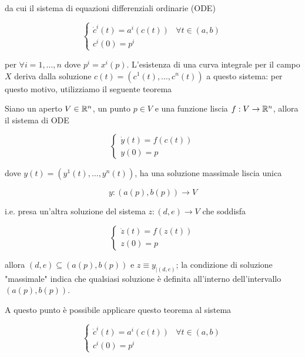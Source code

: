 da cui il sistema di equazioni differenziali ordinarie (ODE)

\begin{equation}
	\begin{cases}
		\dot{c}^{i}(t) = a^{i}(c(t)) & \forall t \in (a,b)\\
		c^{i}(0) = p^{i}
	\end{cases}
\end{equation}

per $ \forall i=1,\dots,n $ dove $ p^{i} = x^{i} (p) $. L'esistenza di una curva integrale per il campo $ X $ deriva dalla soluzione $ c(t) = (c^{1}(t),\dots,c^{n}(t)) $ a questo sistema: per questo motivo, utilizziamo il seguente teorema

\begin{theorem}
	Siano un aperto $ V \in \mathbb{R}^{n} $, un punto $ p \in V $ e una funzione liscia $ f : V \to \mathbb{R}^{n} $, allora il sistema di ODE
	
	\begin{equation}
		\begin{cases}
			\dot{y}(t) = f(c(t))\\
			y(0) = p
		\end{cases}
	\end{equation}
	
	dove $ y(t) = (y^{1}(t),\dots,y^{n}(t)) $, ha una soluzione massimale liscia unica
	
	\begin{equation}
		y : (a(p),b(p)) \to V
	\end{equation}

	i.e. presa un'altra soluzione del sistema $ z : (d,e) \to V $ che soddisfa
	
	\begin{equation}
		\begin{cases}
			\dot{z}(t) = f(z(t))\\
			z(0) = p
		\end{cases}
	\end{equation}

	allora $ (d,e) \subseteq (a(p),b(p)) $ e $ z \equiv y_{|(d,e)} $; la condizione di soluzione "massimale" indica che qualsiasi soluzione è definita all'interno dell'intervallo $ (a(p),b(p)) $.
\end{theorem}

A questo punto è possibile applicare questo teorema al sistema

\begin{equation}
	\begin{cases}
		\dot{c}^{i}(t) = a^{i}(c(t)) & \forall t \in (a,b)\\
		c^{i}(0) = p^{i}
	\end{cases}
\end{equation}

